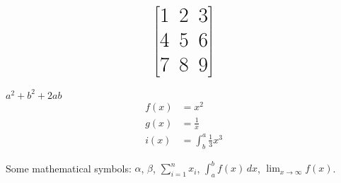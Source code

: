 \documentclass{article}
\begin{document}
\[\huge \begin{bmatrix}
		
		1 & 2 & 3\\
		4 & 5 & 6\\
		7 & 8 & 9
		
	\end{bmatrix}\]
    
    
    \begin{math}	
     a^2+b^2+2ab	
    \end{math}
\begin{align*}
  f(x) &=x^2\\
  g(x)&=\frac{1}{x}\\
  i(x)&=\int^a_b\frac{1}{3}x^3
\end{align*}

Some mathematical symbols: $\alpha$, $\beta$, $\sum_{i=1}^{n} x_i$,
$\int_{a}^{b} f(x) \, dx$, $\lim_{x \to \infty} f(x)$.

    
\end{document}
